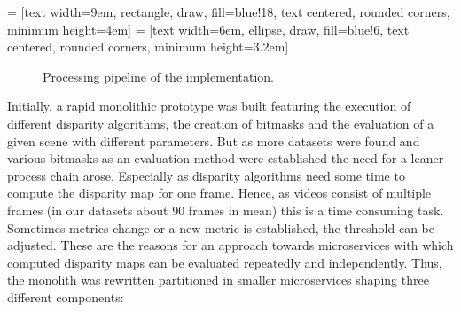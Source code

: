  = [text width=9em, rectangle, draw, fill=blue!18, text centered, rounded corners, minimum height=4em]
 = [text width=6em, ellipse, draw, fill=blue!6, text centered, rounded corners, minimum height=3.2em]
\begin{figure}[h!]
  \centering
  \caption{Processing pipeline of the implementation.}
  \label{fig:impl-pipeline}
\end{figure}

Initially, a rapid monolithic prototype was built featuring the execution of different disparity algorithms, the creation of bitmasks and the evaluation of a given scene with different parameters.
But as more datasets were found and various bitmasks as an evaluation method were established the need for a leaner process chain arose.
Especially as disparity algorithms need some time to compute the disparity map for one frame.
Hence, as videos consist of multiple frames (in our datasets about 90 frames in mean) this is a time consuming task.
Sometimes metrics change or a new metric is established, the threshold can be adjusted.
These are the reasons for an approach towards microservices with which computed disparity maps can be evaluated repeatedly and independently.
Thus, the monolith was rewritten partitioned in smaller microservices shaping three different components:

